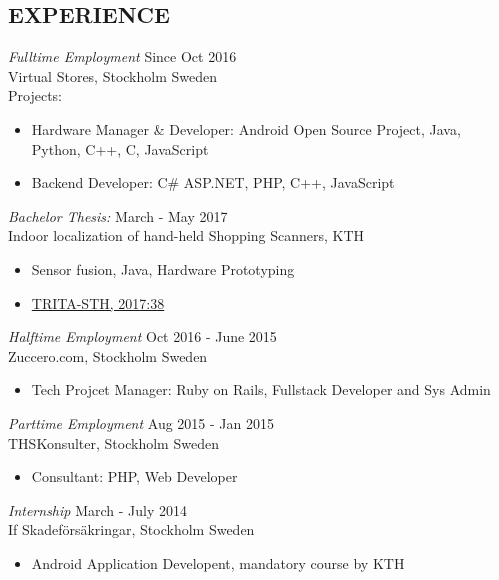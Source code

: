 \documentclass[margin]{res}
\begin{document}
\begin{resume}
 
\section{EXPERIENCE}
{\sl Fulltime Employment } \hfill Since Oct 2016 \\
                Virtual Stores, Stockholm Sweden \\ 
                Projects:
                \begin{itemize} \itemsep -3pt

                \item Hardware Manager \& Developer:  Android Open Source Project, Java, Python, C++, C, JavaScript\hfill 
                \item Backend Developer:  C\# ASP.NET, PHP, C++, JavaScript\hfill 
                \end{itemize}
{\sl Bachelor Thesis: } \hfill March - May 2017\\
Indoor localization of hand-held Shopping Scanners, KTH
 \begin{itemize} \itemsep -3pt
                \item Sensor fusion, Java, Hardware Prototyping \hfill 
                \item \href{http://kth.diva-portal.org/smash/record.jsf?pid=diva2\%3A1108974}{TRITA-STH, 2017:38} \hfill 
                \end{itemize}

{\sl Halftime Employment } \hfill  Oct 2016 - June 2015 \\
                Zuccero.com, Stockholm Sweden
                 \begin{itemize}  \itemsep -3pt %
                 \item  Tech Projcet Manager: Ruby on Rails, Fullstack Developer and Sys Admin\hfill 
                \end{itemize}
{\sl Parttime Employment } \hfill  Aug 2015 - Jan 2015 \\
                THSKonsulter, Stockholm Sweden
                 \begin{itemize}  \itemsep -3pt %
                 \item  Consultant: PHP, Web Developer\hfill 
                \end{itemize}
    {\sl Internship } \hfill March - July 2014 \\
                If Skadeförsäkringar, Stockholm Sweden
                 \begin{itemize}  \itemsep -3pt %
                 \item Android Application Developent, mandatory course by KTH 
                \end{itemize}        



\end{resume}
\end{document}
